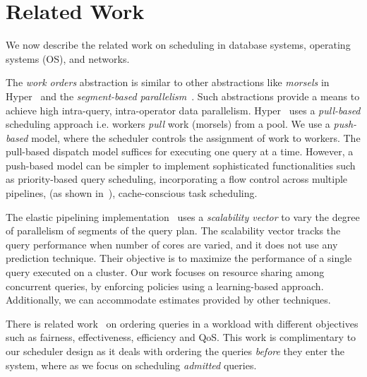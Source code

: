 \section{Related Work}\label{sec:related}
We now describe the related work on scheduling in database systems, operating systems (OS), and networks. %

The \textit{work orders} abstraction is similar to other abstractions like \textit{morsels} in Hyper~\cite{morsel} and the \textit{segment-based parallelism}~\cite{wang2016elastic}. 
Such abstractions provide a means to achieve high intra-query, intra-operator data parallelism.
Hyper~\cite{morsel} uses a \textit{pull-based} scheduling approach i.e. workers \textit{pull} work (morsels) from a pool.
We use a \textit{push-based} model, where the scheduler controls the assignment of work to workers.
The pull-based dispatch model suffices for executing one query at a time. 
However, a push-based model can be simpler to implement sophisticated functionalities such as priority-based query scheduling, incorporating a flow control across multiple pipelines, (as shown in~\cite{wang2016elastic}), cache-conscious task scheduling.

The elastic pipelining implementation~\cite{wang2016elastic} uses a \textit{scalability vector} to vary the degree of parallelism of segments of the query plan.
The scalability vector tracks the query performance when number of cores are varied,  and it does not use any prediction technique.
Their objective is to maximize the performance of a single query executed on a cluster.
Our work focuses on resource sharing among concurrent queries, by enforcing policies using a learning-based approach. 
Additionally, we can accommodate estimates provided by other techniques.

There is related work~\cite{gupta2009fair} on ordering queries in a workload with different objectives such as fairness, effectiveness, efficiency and QoS. 
This work is complimentary to our scheduler design as it deals with ordering the queries \textit{before} they enter the system, where as we focus on scheduling \textit{admitted} queries. 

